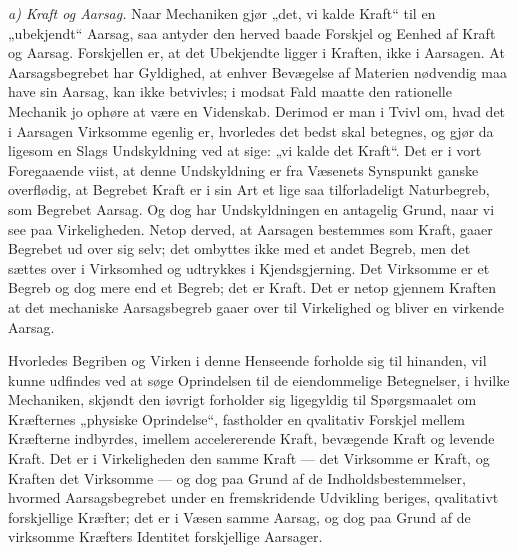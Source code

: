 \documentclass[12pt,a4paper]{book}
\newcommand{\runin}[1]{\emph{#1}\hspace{0.4em}}
\begin{document}
\runin{a) Kraft og Aarsag.} Naar Mechaniken gjør „det, vi kalde Kraft“
til en „ubekjendt“ Aarsag, saa antyder den herved baade Forskjel og
Eenhed af Kraft og Aarsag. Forskjellen er, at det Ubekjendte ligger i
Kraften, ikke i Aarsagen. At Aarsagsbegrebet har Gyldighed, at enhver
Bevægelse af Materien nødvendig maa have sin Aarsag, kan ikke betvivles;
i modsat Fald maatte den rationelle Mechanik jo ophøre at være en
Videnskab. Derimod er man i Tvivl om, hvad det i Aarsagen Virksomme
egenlig er, hvorledes
det bedst skal betegnes, og gjør da ligesom en Slags Undskyldning ved at
sige: „vi kalde det Kraft“. Det er i vort Foregaaende viist, at denne
Undskyldning er fra Væsenets Synspunkt ganske overflødig, at Begrebet
Kraft er i sin Art et lige saa tilforladeligt Naturbegreb, som Begrebet
Aarsag. Og dog har Undskyldningen en antagelig Grund, naar vi see paa
Virkeligheden. Netop derved, at Aarsagen bestemmes som Kraft, gaaer
Begrebet ud over sig selv; det ombyttes ikke med et andet Begreb, men det
sættes over i Virksomhed og udtrykkes i Kjendsgjerning. Det Virksomme er
et Begreb og dog mere end et Begreb; det er Kraft. Det er netop gjennem
Kraften at det mechaniske Aarsagsbegreb gaaer over til Virkelighed og
bliver en virkende Aarsag.

Hvorledes Begriben og Virken i denne Henseende forholde sig til hinanden,
vil kunne udfindes ved at søge Oprindelsen til de eiendommelige
Betegnelser, i hvilke Mechaniken, skjøndt den iøvrigt forholder sig
ligegyldig til Spørgsmaalet om Kræfternes „physiske Oprindelse“,
fastholder en qvalitativ Forskjel mellem Kræfterne indbyrdes, imellem
accelererende Kraft, bevægende Kraft og levende Kraft. Det er i
Virkeligheden den samme Kraft --- det Virksomme er Kraft, og Kraften det
Virksomme --- og dog paa Grund af de Indholdsbestemmelser, hvormed
Aarsagsbegrebet under en fremskridende Udvikling beriges, qvalitativt
forskjellige Kræfter; det er i Væsen samme Aarsag, og dog paa Grund af de
virksomme Kræfters Identitet forskjellige Aarsager.
\end{document}
